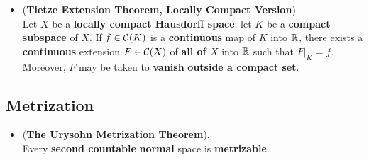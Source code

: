 \documentclass[11pt]{article}
\begin{document}
\begin{itemize}
\item \begin{theorem} (\textbf{Tietze Extension Theorem, Locally Compact Version}) \citep{folland2013real}\\
Let $X$ be a \textbf{locally compact Hausdorff space}; let $K$ be a \textbf{compact subspace} of $X$. If $f \in {\mathcal C}(K)$ is a \textbf{continuous} map of $K$ into ${\mathbb R}$,   there exists a \textbf{continuous} extension $F \in {\mathcal C}(X)$ of \textbf{all of $X$} into ${\mathbb R}$ such that $F|_{K} = f$. Moreover, $F$ may be taken to \textbf{vanish}\textbf{ outside a compact set}.
\end{theorem} 
\end{itemize}

\subsection{Metrization}
\begin{itemize}
\item \begin{theorem} (\textbf{The Urysohn Metrization Theorem}). \citep{munkres1975topology, folland2013real}\\
Every \textbf{second countable} \textbf{normal} space is \textbf{metrizable}.
\end{theorem}

\end{itemize}
\end{document}
